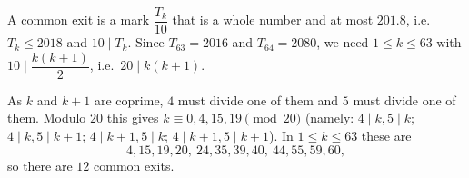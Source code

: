 A common exit is a mark $\dfrac{T_k}{10}$ that is a whole number and at most $201.8$, i.e.\ $T_k\le2018$ and $10\mid T_k$. Since $T_{63}=2016$ and $T_{64}=2080$, we need $1\le k\le63$ with $10\mid\dfrac{k(k+1)}{2}$, i.e.\ $20\mid k(k+1)$.

As $k$ and $k+1$ are coprime, $4$ must divide one of them and $5$ must divide one of them. Modulo $20$ this gives $k\equiv0,4,15,19\pmod{20}$ (namely: $4\mid k,5\mid k$; $4\mid k,5\mid k+1$; $4\mid k+1,5\mid k$; $4\mid k+1,5\mid k+1$). In $1\le k\le63$ these are
\[
4,15,19,20,\ 24,35,39,40,\ 44,55,59,60,
\]
so there are $\boxed{12}$ common exits.
